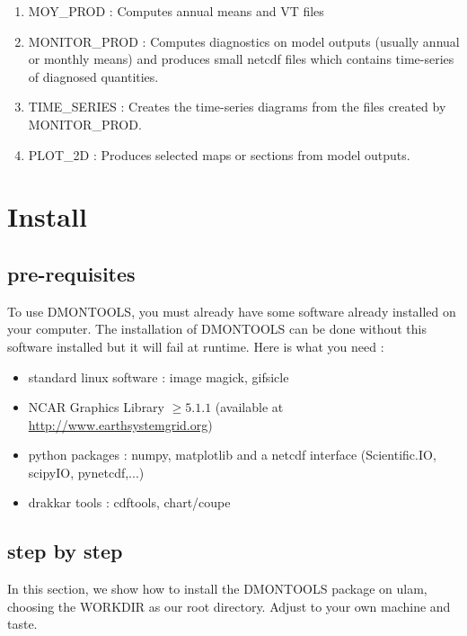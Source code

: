 \documentclass[a4paper,11pt]{article}
\begin{document}
\begin{enumerate}
\item MOY\_PROD : Computes annual means and VT files
\item MONITOR\_PROD : Computes diagnostics on model outputs (usually annual or monthly means) and produces small netcdf
files which contains time-series of diagnosed quantities.
\item TIME\_SERIES : Creates the time-series diagrams  from the files created by MONITOR\_PROD.
\item PLOT\_2D : Produces selected maps or sections from model outputs. 
\end{enumerate}

\clearpage
\newpage

\section{Install}

\subsection{pre-requisites}

To use DMONTOOLS, you must already have some software already installed on your computer. The installation
of DMONTOOLS can be done without this software installed but it will fail at runtime. Here is what you need :

\begin{itemize}
\item standard linux software : image magick, gifsicle
\item NCAR Graphics Library $ \geq 5.1.1$ (available at \url{http://www.earthsystemgrid.org})
\item python packages : numpy, matplotlib and a netcdf interface (Scientific.IO, scipyIO, pynetcdf,...)
\item drakkar tools : cdftools, chart/coupe 
\end{itemize}

\subsection{step by step}

\noindent
In this section, we show how to install the DMONTOOLS package on ulam, choosing the WORKDIR as our root
directory. Adjust to your own machine and taste.
\end{document}
